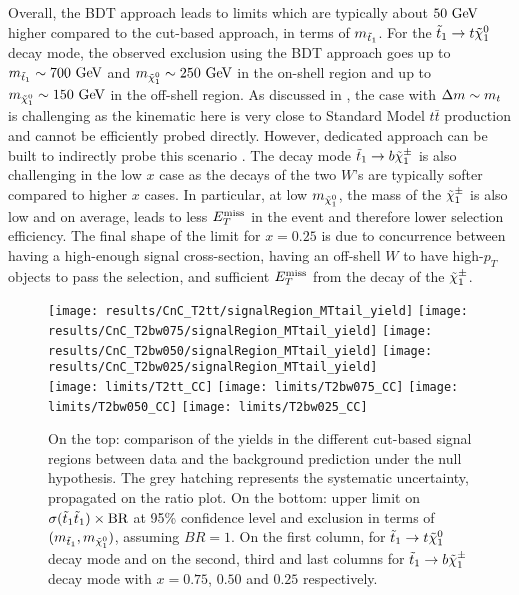     Overall, the BDT approach leads to limits which are typically about $50~\text{GeV}$ higher
    compared to the cut-based approach, in terms of $m_{\tilde{t}_1}$. For the $\tilde{t}_1
    \rightarrow t \tilde{\chi}_1^0$ decay mode, the observed exclusion using the BDT approach
    goes up to $m_{\tilde{t}_1} \sim 700~\text{GeV}$ and $m_{\tilde{\chi}_1^0} \sim 250~\text{GeV}$ in the
    on-shell region and up to $m_{\tilde{\chi}_1^0} \sim 150~\text{GeV}$ in the off-shell region.
    As discussed in , the case with $\Delta m \sim
    m_{t}$ is challenging as the kinematic here is very close to Standard Model $t\bar{t}$
    production and cannot be efficiently probed directly. However, dedicated approach can
    be built to indirectly probe this scenario \cite{SUS-13-021, ClosingStopGap}. The
    decay mode $\tilde{t}_1 \rightarrow b \tilde{\chi}_1^\pm$ is also challenging in the low $x$ case
    as the decays of the two $W$'s are typically softer compared to higher $x$ cases. In
    particular, at low $m_{\tilde{\chi}_1^0}$, the mass of the $\tilde{\chi}_1^\pm$ is also low and
    on average, leads to less $E_T^\text{miss}$ in the event and therefore lower selection efficiency. The final shape
    of the limit for $x = 0.25$ is due to concurrence between having a high-enough signal cross-section,
    having an off-shell $W$ to have high-$p_T$ objects to pass the selection, and
    sufficient $E_T^\text{miss}$ from the decay of the $\tilde{\chi}_1^\pm$.

    \begin{landscape}
        \thispagestyle{empty}
        \vspace*{1cm}
    \begin{figure}[h!]
        \centering
        \texttt{[image: results/CnC\_T2tt/signalRegion\_MTtail\_yield]}
        \texttt{[image: results/CnC\_T2bw075/signalRegion\_MTtail\_yield]}
        \texttt{[image: results/CnC\_T2bw050/signalRegion\_MTtail\_yield]}
        \texttt{[image: results/CnC\_T2bw025/signalRegion\_MTtail\_yield]}\\
        \texttt{[image: limits/T2tt\_CC]}
        \texttt{[image: limits/T2bw075\_CC]}
        \texttt{[image: limits/T2bw050\_CC]}
        \texttt{[image: limits/T2bw025\_CC]}
        \caption{On the top: comparison of the yields in the different cut-based signal
        regions between data and the background prediction under the null hypothesis. The
        grey hatching represents the systematic uncertainty, propagated on the ratio plot.
        On the bottom: upper limit on $\sigma(\tilde{t}_1\tilde{t}_1) \times \text{BR}$ at 95\% confidence level and exclusion in terms of
        $(m_{\tilde{t}_1},m_{\tilde{\chi}_1^0})$, assuming
        $BR = 1$. On the first column, for $\tilde{t}_1 \rightarrow t \tilde{\chi}_1^0$ decay mode and on
        the second, third and last columns for $\tilde{t}_1 \rightarrow b \tilde{\chi}_1^\pm$ decay mode
        with $x=0.75$, $0.50$ and $0.25$ respectively.}
        \label{fig:resultsCnC}
    \end{figure}
    \end{landscape}

